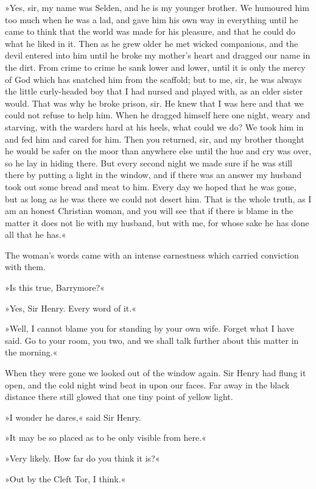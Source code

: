 »Yes, sir, my name was Selden, and he is my younger brother. We humoured him too much when he was a lad, and gave him his own way in everything until he came to think that the world was made for his pleasure, and that he could do what he liked in it. Then as he grew older he met wicked companions, and the devil entered into him until he broke my mother's heart and dragged our name in the dirt. From crime to crime he sank lower and lower, until it is only the mercy of God which has snatched him from the scaffold; but to me, sir, he was always the little curly-headed boy that I had nursed and played with, as an elder sister would. That was why he broke prison, sir. He knew that I was here and that we could not refuse to help him. When he dragged himself here one night, weary and starving, with the warders hard at his heels, what could we do? We took him in and fed him and cared for him. Then you returned, sir, and my brother thought he would be safer on the moor than anywhere else until the hue and cry was over, so he lay in hiding there. But every second night we made sure if he was still there by putting a light in the window, and if there was an answer my husband took out some bread and meat to him. Every day we hoped that he was gone, but as long as he was there we could not desert him. That is the whole truth, as I am an honest Christian woman, and you will see that if there is blame in the matter it does not lie with my husband, but with me, for whose sake he has done all that he has.«

The woman's words came with an intense earnestness which carried conviction with them.

»Is this true, Barrymore?«

»Yes, Sir Henry. Every word of it.«

»Well, I cannot blame you for standing by your own wife. Forget what I have said. Go to your room, you two, and we shall talk further about this matter in the morning.«

When they were gone we looked out of the window again. Sir Henry had flung it open, and the cold night wind beat in upon our faces. Far away in the black distance there still glowed that one tiny point of yellow light.

»I wonder he dares,« said Sir Henry.

»It may be so placed as to be only visible from here.«

»Very likely. How far do you think it is?«

»Out by the Cleft Tor, I think.«

